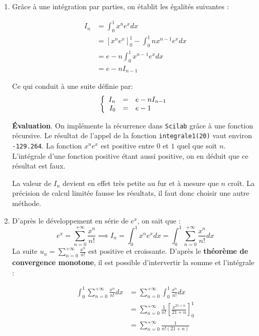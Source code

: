 \documentclass[a4paper,11pt]{article}
\theoremstyle{nonumberplain}
\theoremstyle{nonumberplain}
\begin{document}
    \begin{enumerate}
        \setlength\itemsep{2em}
        \item
        Grâce à une intégration par parties, on établit les égalités suivantes :

        \begin{equation*}
        \begin{split}
            I_{n}   & = \int_{0}^{1} x^{n}e^{x} dx \\
                    & = [x^{n}e^{x}]_{0}^{1} - \int_{0}^{1} n x^{n-1}e^{x} dx \\
                    & = e - n\int_{0}^{1} x^{n-1}e^{x} dx \\
                    & = e - n I_{n-1}
        \end{split}
        \end{equation*}

        Ce qui conduit à une suite définie par:
        \[
        \left\{
        \begin{array}{r c l}
            I_{n} &=& e - n I_{n-1}\\
            I_{0} &=& e - 1
        \end{array}
        \right.
        \]

        \textbf{\'{E}valuation}. On implémente la récurrence dans \texttt{Scilab} grâce à une fonction récursive.
        Le résultat de l'appel de la fonction \texttt{integrale1(20)} vaut environ \texttt{-129.264}.
        La fonction $x^{n}e^{x}$ est positive entre $0$ et $1$ quel que soit $n$.
        L'intégrale d'une fonction positive étant aussi positive, on en déduit que ce résultat est faux.

        La valeur de $I_{n}$ devient en effet très petite au fur et à mesure que $n$ croît.
        La précision de calcul limitée fausse les résultats, il faut donc choisir une autre méthode.

        \item
        D'après le développement en série de $e^{x}$, on sait que :
        $$e^{x} =  \sum\limits_{n = 0}^{+\infty} \frac{x^{n}}{n!} \implies I_{n} = \int_{0}^{1} x^{n}e^{x} dx = \int_{0}^{1}\sum\limits_{n = 0}^{+\infty} \frac{x^{n}}{n!} dx$$
        La suite $u_{n} = \sum\limits_{n = 0}^{+\infty} \frac{x^{n}}{n!}$ est positive et croissante. D'après le \textbf{théorème
        de convergence monotone}, il est possible d'intervertir la somme et l'intégrale :

        \begin{equation*}
        \begin{split}
            \int_{0}^{1}\sum\limits_{n = 0}^{+\infty} \frac{x^{n}}{n!} dx   & = \sum\limits_{n = 0}^{+\infty}\int_{0}^{1}\frac{x^{n}}{n!} dx \\
                                                                            & = \sum\limits_{n = 0}^{+\infty} \frac{1}{n!}\left[\frac{x^{21 + n}}{21 + n}\right]_{0}^{1} \\
                                                                            & = \sum\limits_{n = 0}^{+\infty} \frac{1}{n! (21+n)}
        \end{split}
        \end{equation*}


\end{enumerate}
\end{document}
